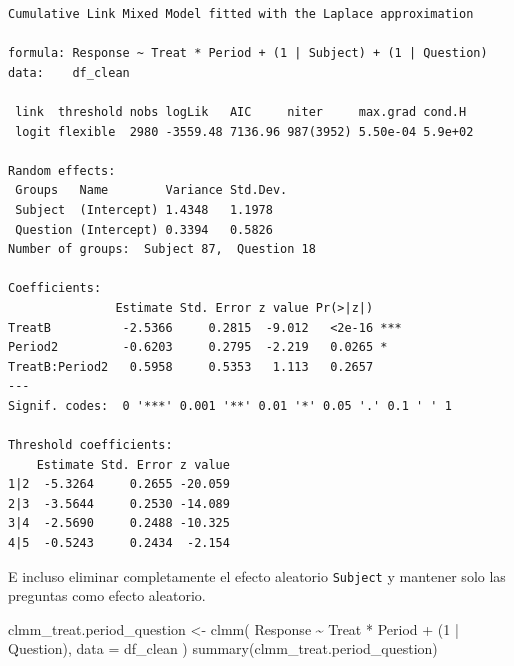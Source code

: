 \documentclass[
  12pt,
  a4paper,
  extrafontsizes,
  onecolumn,
  openright]{memoir}
\newenvironment{Shaded}{\begin{snugshade}}{\end{snugshade}}
\newcommand{\AttributeTok}[1]{\textcolor[rgb]{0.40,0.45,0.13}{#1}}
\newcommand{\DecValTok}[1]{\textcolor[rgb]{0.68,0.00,0.00}{#1}}
\newcommand{\FunctionTok}[1]{\textcolor[rgb]{0.28,0.35,0.67}{#1}}
\newcommand{\NormalTok}[1]{\textcolor[rgb]{0.00,0.23,0.31}{#1}}
\newcommand{\OtherTok}[1]{\textcolor[rgb]{0.00,0.23,0.31}{#1}}
\newcommand{\SpecialCharTok}[1]{\textcolor[rgb]{0.37,0.37,0.37}{#1}}
\begin{document}
\begin{verbatim}
Cumulative Link Mixed Model fitted with the Laplace approximation

formula: Response ~ Treat * Period + (1 | Subject) + (1 | Question)
data:    df_clean

 link  threshold nobs logLik   AIC     niter     max.grad cond.H 
 logit flexible  2980 -3559.48 7136.96 987(3952) 5.50e-04 5.9e+02

Random effects:
 Groups   Name        Variance Std.Dev.
 Subject  (Intercept) 1.4348   1.1978  
 Question (Intercept) 0.3394   0.5826  
Number of groups:  Subject 87,  Question 18 

Coefficients:
               Estimate Std. Error z value Pr(>|z|)    
TreatB          -2.5366     0.2815  -9.012   <2e-16 ***
Period2         -0.6203     0.2795  -2.219   0.0265 *  
TreatB:Period2   0.5958     0.5353   1.113   0.2657    
---
Signif. codes:  0 '***' 0.001 '**' 0.01 '*' 0.05 '.' 0.1 ' ' 1

Threshold coefficients:
    Estimate Std. Error z value
1|2  -5.3264     0.2655 -20.059
2|3  -3.5644     0.2530 -14.089
3|4  -2.5690     0.2488 -10.325
4|5  -0.5243     0.2434  -2.154
\end{verbatim}

\normalsize

E incluso eliminar completamente el efecto aleatorio \texttt{Subject} y
mantener solo las preguntas como efecto aleatorio.

\scriptsize

\begin{Shaded}
\begin{Highlighting}[]
\NormalTok{clmm\_treat.period\_question }\OtherTok{\textless{}{-}} \FunctionTok{clmm}\NormalTok{(}
\NormalTok{    Response }\SpecialCharTok{\textasciitilde{}}\NormalTok{ Treat }\SpecialCharTok{*}\NormalTok{ Period }\SpecialCharTok{+}\NormalTok{ (}\DecValTok{1} \SpecialCharTok{|}\NormalTok{ Question),}
    \AttributeTok{data =}\NormalTok{ df\_clean}
\NormalTok{)}
\FunctionTok{summary}\NormalTok{(clmm\_treat.period\_question)}
\end{Highlighting}
\end{Shaded}
\end{document}
